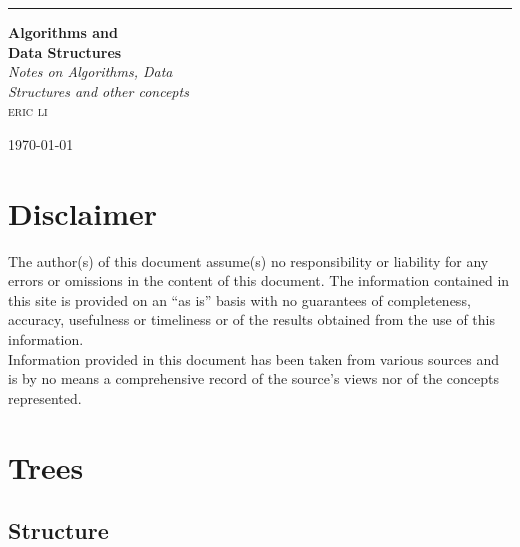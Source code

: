 \documentclass[hidelinks,11pt]{article}
\begin{document}
\begin{titlepage} %

	\raggedleft %
	\rule{1pt}{\textheight} %
	\hspace{0.05\textwidth} %
	\parbox[b]{0.75\textwidth}{ %
        {\Huge\bfseries Algorithms and\\[0.5\baselineskip]Data Structures }\\[2\baselineskip] %
        
        {\large\textit{Notes on Algorithms, Data \\[0.5\baselineskip]Structures and other concepts}}\\[4\baselineskip] %
        
        {\Large\textsc{eric li}} %
        
        \vspace{0.5\textheight} %
        
        {\noindent\large\today}\\[\baselineskip]
    }
\end{titlepage}
\tableofcontents
\newpage
\section{Disclaimer}
The author(s) of this document assume(s) no responsibility or liability for any errors or omissions in the content of this document. The information contained in this site is provided on an “as is” basis with no guarantees of completeness, accuracy, usefulness or timeliness or of the results obtained from the use of this information.\\[0.5\baselineskip]
Information provided in this document has been taken from various sources and is by no means a comprehensive record of the source's views nor of the concepts represented.
\section{Trees}
\subsection{Structure}
\end{document}
